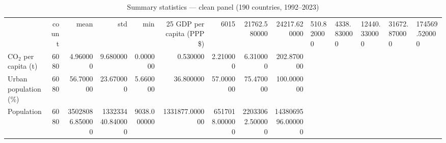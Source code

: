\begin{table}
\caption{Summary statistics --- clean panel (190 countries, 1992--2023)}
\label{tab:sumstats}
\begin{tabular}{lrrrrrrrr}
\toprule
 & count & mean & std & min & 25%
\midrule
GDP per capita (PPP \$) & 6015 & 21762.580000 & 24217.620000 & 510.820000 & 4338.830000 & 12440.330000 & 31672.870000 & 174569.520000 \\
CO$_2$ per capita (t) & 6080 & 4.960000 & 9.680000 & 0.000000 & 0.530000 & 2.210000 & 6.310000 & 202.870000 \\
Urban population (\%) & 6080 & 56.700000 & 23.670000 & 5.660000 & 36.800000 & 57.000000 & 75.470000 & 100.000000 \\
Population & 6080 & 35028086.850000 & 133233440.840000 & 9038.000000 & 1331877.000000 & 6517018.000000 & 22033062.500000 & 1438069596.000000 \\
\bottomrule
\end{tabular}
\end{table}
